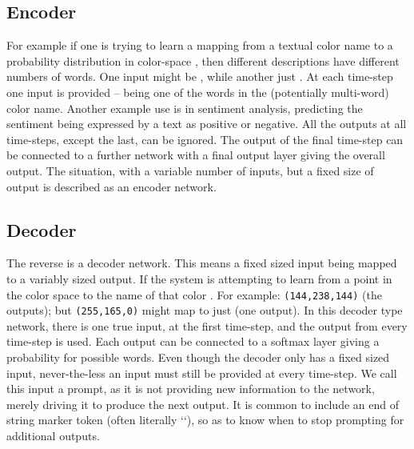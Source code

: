 \documentclass[12pt,parskip]{komatufte}
\begin{document}
\subsection{Encoder}

For example if one is trying to learn a mapping from a textual color name to a probability distribution in color-space , then different descriptions have different numbers of words.
One input might be , while another just .
At each time-step one input is provided -- being one of the words in the (potentially multi-word) color name.
Another example use is in sentiment analysis, predicting the sentiment being expressed by a text as positive or negative.
All the outputs at all time-steps, except the last, can be ignored.
The output of the final time-step can be connected to a further network with a final output layer giving the overall output.
The situation, with a variable number of inputs, but a fixed size of output is described as an encoder network.

\subsection{Decoder}



The reverse is a decoder network.
This means a fixed sized input being mapped to a variably sized output.
If the system is attempting to learn from a point in the color space to the name of that color .
For example: \texttt{(144,238,144)}  (the outputs); but \texttt{(255,165,0)} might map to just  (one output).
In this decoder type network, there is one true input, at the first time-step, and the output from every time-step is used.
Each output can be connected to a softmax layer giving a probability for possible words.
Even though the decoder only has a fixed sized input,
never-the-less  an input must still be provided at every time-step.
We call this input a prompt, as it is not providing new information to the network, merely driving it to produce the next output.
It is common to include an end of string marker token (often literally ``),
so as to know when to stop prompting for additional outputs.
\end{document}
